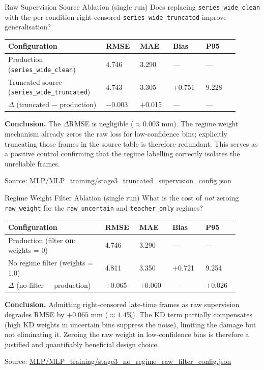 \documentclass[UTF8,aspectratio=169]{ctexbeamer}
\newcommand{\src}[1]{\vfill{\tiny\textcolor{gray!75!black}{Source: \url{#1}}}}
\begin{document}
\begin{frame}{Raw Supervision Source Ablation (single run)}
\small
Does replacing \texttt{series\_wide\_clean} with the per-condition
right-censored \texttt{series\_wide\_truncated} improve generalisation?
\vspace{0.35em}
\begin{center}
\begin{tabular}{L{0.38\linewidth}R{0.13\linewidth}R{0.13\linewidth}R{0.13\linewidth}R{0.13\linewidth}}
\toprule
Configuration & RMSE & MAE & Bias & P95 \\
\midrule
Production (\texttt{series\_wide\_clean})     & 4.746 & 3.290 & --- & --- \\
Truncated source (\texttt{series\_wide\_truncated}) & 4.743 & 3.305 & +0.751 & 9.228 \\
\midrule
\(\Delta\) (truncated \(-\) production) & \(-\)0.003 & +0.015 & --- & --- \\
\bottomrule
\end{tabular}
\end{center}
\vspace{0.3em}
\textbf{Conclusion.} The \(\Delta\)RMSE is negligible (\(\approx0.003\) mm).
The regime weight mechanism already zeros the raw loss for low-confidence
bins; explicitly truncating those frames in the source table is therefore
redundant. This serves as a positive control confirming that the regime
labelling correctly isolates the unreliable frames.

\src{MLP/MLP\_training/stage3\_truncated\_supervision\_config.json}
\end{frame}

\begin{frame}{Regime Weight Filter Ablation (single run)}
\small
What is the cost of \emph{not} zeroing \texttt{raw\_weight} for the
\texttt{raw\_uncertain} and \texttt{teacher\_only} regimes?
\vspace{0.35em}
\begin{center}
\begin{tabular}{L{0.38\linewidth}R{0.13\linewidth}R{0.13\linewidth}R{0.13\linewidth}R{0.13\linewidth}}
\toprule
Configuration & RMSE & MAE & Bias & P95 \\
\midrule
Production (filter \textbf{on}: weights = 0) & 4.746 & 3.290 & --- & --- \\
No regime filter (weights = 1.0) & 4.811 & 3.350 & +0.721 & 9.254 \\
\midrule
\(\Delta\) (no-filter \(-\) production) & +0.065 & +0.060 & --- & +0.026 \\
\bottomrule
\end{tabular}
\end{center}
\vspace{0.3em}
\textbf{Conclusion.} Admitting right-censored late-time frames as raw
supervision degrades RMSE by \(+0.065\) mm (\(\approx1.4\%\)).
The KD term partially compensates (high KD weights in uncertain bins
suppress the noise), limiting the damage but not eliminating it.
Zeroing the raw weight in low-confidence bins is therefore a justified
and quantifiably beneficial design choice.

\src{MLP/MLP\_training/stage3\_no\_regime\_raw\_filter\_config.json}
\end{frame}
\end{document}
